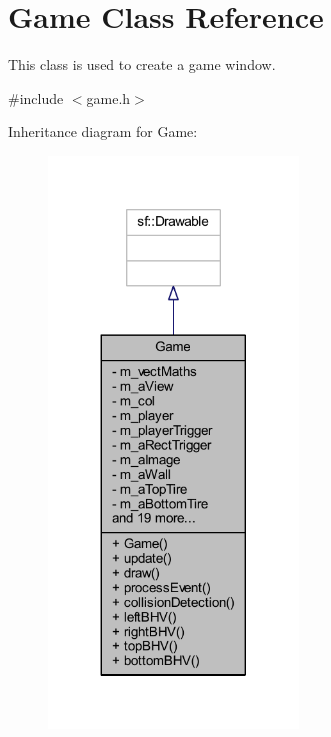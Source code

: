 \hypertarget{class_game}{}\section{Game Class Reference}
\label{class_game}


This class is used to create a game window.  




{\ttfamily \#include $<$game.\+h$>$}



Inheritance diagram for Game\+:\nopagebreak
\begin{figure}[H]
\begin{center}
\leavevmode
\includegraphics[width=188pt]{class_game__inherit__graph}
\end{center}
\end{figure}


